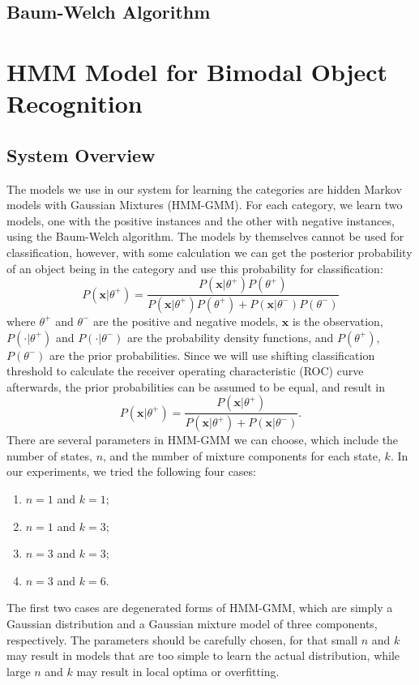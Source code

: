 \documentclass[12pt,final,twoside]{report}
\theoremstyle{plain}
\theoremstyle{definition}
\theoremstyle{remark}
\begin{document}
\section{Baum-Welch Algorithm}

\cleardoublepage
\chapter{HMM Model for Bimodal Object Recognition}
\section{System Overview}
The models we use in our system for learning the categories are hidden Markov models with Gaussian Mixtures (HMM-GMM). For each category, we learn two models, one with the positive instances and the other with negative instances, using the Baum-Welch algorithm. The models by themselves cannot be used for classification, however, with some calculation we can get the posterior probability of an object being in the category and use this probability for classification:
\begin{equation}
  P(\mathbf{x}|\theta^+) = \frac{P(\mathbf{x}|\theta^+)P(\theta^+)}{P(\mathbf{x}|\theta^+)P(\theta^+) + P(\mathbf{x}|\theta^-)P(\theta^-)}
\end{equation}
where $\theta^+$ and $\theta^-$ are the positive and negative models, $\mathbf{x}$ is the observation, $P(\cdot|\theta^+)$ and $P(\cdot|\theta^-)$ are the probability density functions, and $P(\theta^+)$, $P(\theta^-)$ are the prior probabilities. Since we will use shifting classification threshold to calculate the receiver operating characteristic (ROC) curve afterwards, the prior probabilities can be assumed to be equal, and result in
\begin{equation}
  P(\mathbf{x}|\theta^+) = \frac{P(\mathbf{x}|\theta^+)}{P(\mathbf{x}|\theta^+) + P(\mathbf{x}|\theta^-)} .
\end{equation}
There are several parameters in HMM-GMM we can choose, which include the number of states, $n$, and the number of mixture components for each state, $k$. In our experiments, we tried the following four cases:
\begin{enumerate}
  \item $n = 1$ and $k = 1$;
  \item $n = 1$ and $k = 3$;
  \item $n = 3$ and $k = 3$;
  \item $n = 3$ and $k = 6$.
\end{enumerate}
The first two cases are degenerated forms of HMM-GMM, which are simply a Gaussian distribution and a Gaussian mixture model of three components, respectively. The parameters should be carefully chosen, for that small $n$ and $k$ may result in models that are too simple to learn the actual distribution, while large $n$ and $k$ may result in local optima or overfitting.
\end{document}
